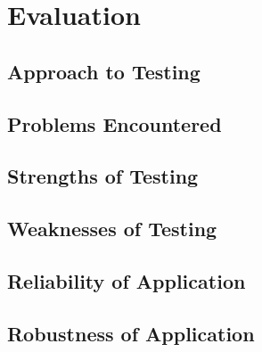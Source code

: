 \section{Evaluation}

\subsection{Approach to Testing}

\subsection{Problems Encountered}

\subsection{Strengths of Testing}

\subsection{Weaknesses of Testing}

\subsection{Reliability of Application}

\subsection{Robustness of Application}
